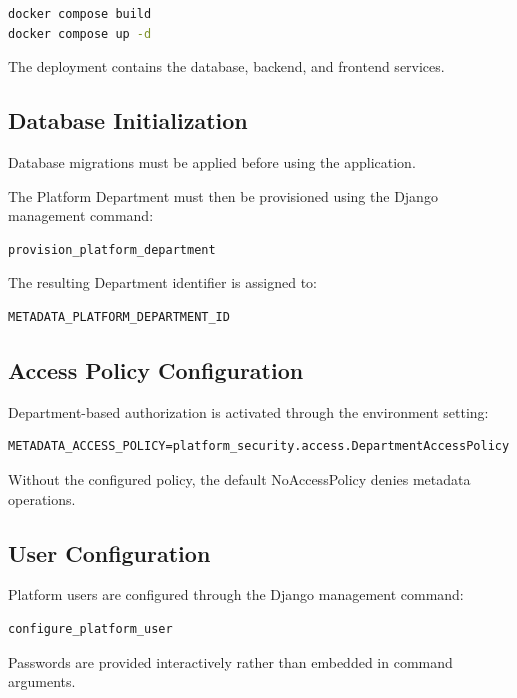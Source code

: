\documentclass[11pt,a4paper]{article}
\begin{document}
\begin{lstlisting}[language=bash]
docker compose build
docker compose up -d
\end{lstlisting}

The deployment contains the database,
backend, and frontend services.

\subsection{Database Initialization}

Database migrations must be applied
before using the application.

The Platform Department must then
be provisioned using the Django
management command:

\begin{lstlisting}
provision_platform_department
\end{lstlisting}

The resulting Department identifier
is assigned to:

\begin{lstlisting}
METADATA_PLATFORM_DEPARTMENT_ID
\end{lstlisting}

\subsection{Access Policy Configuration}

Department-based authorization is
activated through the environment setting:

\begin{lstlisting}
METADATA_ACCESS_POLICY=platform_security.access.DepartmentAccessPolicy
\end{lstlisting}

Without the configured policy,
the default NoAccessPolicy denies
metadata operations.

\subsection{User Configuration}

Platform users are configured through
the Django management command:

\begin{lstlisting}
configure_platform_user
\end{lstlisting}

Passwords are provided interactively
rather than embedded in command arguments.
\end{document}
